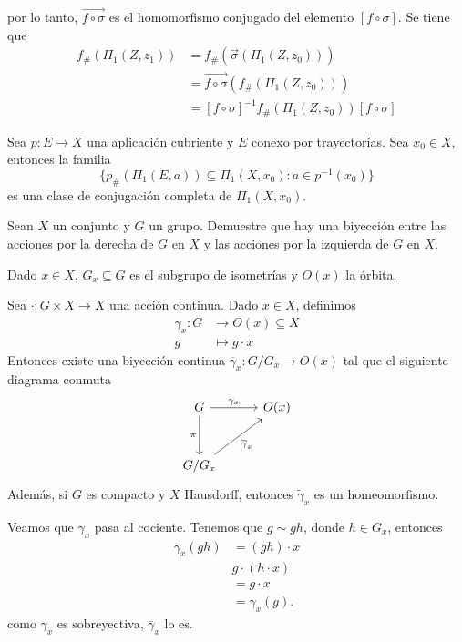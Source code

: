 por lo tanto, $\overrightarrow{f\circ\sigma}$ es el homomorfismo conjugado del elemento $[f\circ\sigma]$. Se tiene que
\begin{align*}
    f_\#(\Pi_1(Z,z_1))&= f_{\#}(\vec{\sigma}(\Pi_1(Z,z_0)))\\
    &=\overrightarrow{f\circ\sigma}(f_{\#}(\Pi_1(Z,z_0)))\\
    &=[f\circ\sigma]^{-1}f_\#(\Pi_1(Z,z_0))[f\circ\sigma]
\end{align*}
\begin{ejercicio}
    Sea $p:E\to X$ una aplicación cubriente y $E$ conexo por trayectorías. Sea $x_0\in X$, entonces la familia
    \begin{equation*}
        \{p_\#(\Pi_1(E,a))\subseteq \Pi_1(X,x_0):a\in p^{-1}(x_0)\}
    \end{equation*}
    es una clase de conjugación completa de $\Pi_1(X,x_0).$
\end{ejercicio}
\begin{ejercicio}
   Sean $X$ un conjunto y $G$ un grupo. Demuestre que hay una biyección entre las acciones por la derecha de $G$ en $X$ y las acciones por la izquierda de $G$ en $X$.
\end{ejercicio}
\begin{notacion}
    Dado $x\in X$, $G_x\subseteq G$ es el subgrupo de isometrías y $O(x)$ la órbita.
\end{notacion}
\begin{prop}
    Sea $\cdot:G\times X\to X$ una acción continua. Dado $x\in X$, definimos
    \begin{align*}
        \gamma_x:G&\to O(x)\subseteq X\\
        g&\mapsto g\cdot x
    \end{align*}
    Entonces existe una biyección continua $\overline{\gamma}_x:G/G_x\to O(x)$ tal que el siguiente diagrama conmuta
    \begin{equation*}
        \begin{tikzcd}[column sep=1cm, row sep=1cm]
            G\arrow[r,"\gamma_x"]\arrow[d,"\pi"'] & O(x)\\
            G/G_x\arrow[ur,"\overline{\gamma}_x"']
        \end{tikzcd}
    \end{equation*}
    Además, si $G$ es compacto y $X$ Hausdorff, entonces $\widetilde{\gamma}_x$ es un homeomorfismo.
\end{prop}
\begin{dem}
    Veamos que $\gamma_x$ pasa al cociente. Tenemos que $g\sim gh$, donde $h\in G_x$, entonces
    \begin{align*}
        \gamma_x(gh)&=(gh)\cdot x\\
        &g\cdot(h\cdot x)\\
        &=g\cdot x\\
        &=\gamma_x(g).
    \end{align*}
    como $\gamma_x$ es sobreyectiva, $\overline{\gamma}_x$ lo es.
\end{dem}
